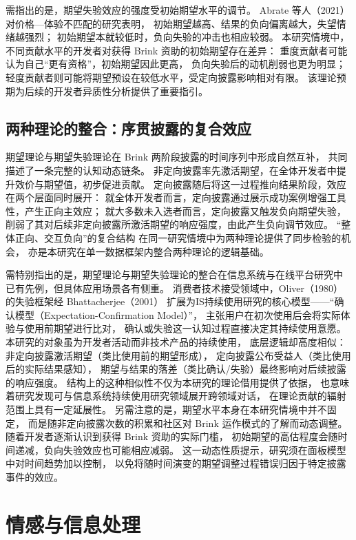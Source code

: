 需指出的是，期望失验效应的强度受初始期望水平的调节。
Abrate 等人（2021）对价格—体验不匹配的研究表明，
初始期望越高、结果的负向偏离越大，失望情绪越强烈；
初始期望本就较低时，负向失验的冲击也相应较弱\cite{abrate2021relationship}。
本研究情境中，不同贡献水平的开发者对获得 Brink 资助的初始期望存在差异：
重度贡献者可能认为自己“更有资格”，初始期望因此更高，
负向失验后的动机削弱也更为明显；
轻度贡献者则可能将期望预设在较低水平，受定向披露影响相对有限。
该理论预期为后续的开发者异质性分析提供了重要指引。

\subsection{两种理论的整合：序贯披露的复合效应}

期望理论与期望失验理论在 Brink 两阶段披露的时间序列中形成自然互补，
共同描述了一条完整的认知动态链条。
非定向披露率先激活期望，在全体开发者中提升效价与期望值，初步促进贡献。
定向披露随后将这一过程推向结果阶段，效应在两个层面同时展开：
就全体开发者而言，定向披露通过展示成功案例增强工具性，产生正向主效应；
就大多数未入选者而言，定向披露又触发负向期望失验，
削弱了其对后续非定向披露所激活期望的响应强度，由此产生负向调节效应。
“整体正向、交互负向”的复合结构
在同一研究情境中为两种理论提供了同步检验的机会，
亦是本研究在单一数据框架内整合两种理论的逻辑基础。

需特别指出的是，期望理论与期望失验理论的整合在信息系统与在线平台研究中
已有先例，但具体应用场景各有侧重。
消费者技术接受领域中，Oliver（1980）的失验框架经 Bhattacherjee（2001）\cite{bhattacherjee2001understanding}
扩展为IS持续使用研究的核心模型——“确认模型（Expectation-Confirmation Model）”，
主张用户在初次使用后会将实际体验与使用前期望进行比对，
确认或失验这一认知过程直接决定其持续使用意愿。
本研究的对象虽为开发者活动而非技术产品的持续使用，
底层逻辑却高度相似：非定向披露激活期望（类比使用前的期望形成），
定向披露公布受益人（类比使用后的实际结果感知），
期望与结果的落差（类比确认/失验）最终影响对后续披露的响应强度。
结构上的这种相似性不仅为本研究的理论借用提供了依据，
也意味着研究发现可与信息系统持续使用研究领域展开跨领域对话，
在理论贡献的辐射范围上具有一定延展性。
另需注意的是，期望水平本身在本研究情境中并不固定，
而是随非定向披露次数的积累和社区对 Brink 运作模式的了解而动态调整。
随着开发者逐渐认识到获得 Brink 资助的实际门槛，
初始期望的高估程度会随时间递减，负向失验效应也可能相应减弱。
这一动态性质提示，研究须在面板模型中对时间趋势加以控制，
以免将随时间演变的期望调整过程错误归因于特定披露事件的效应。

\section{情感与信息处理}

